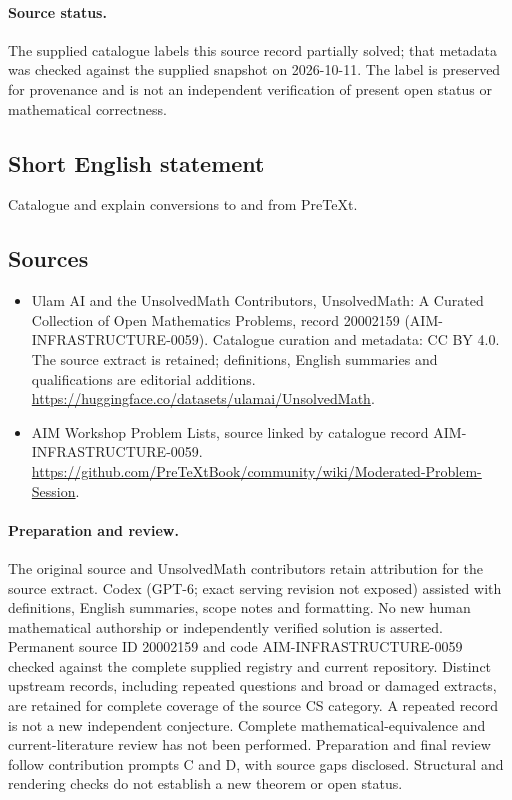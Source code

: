 \documentclass[11pt]{article}
\begin{document}
\paragraph{Source status.}
The supplied catalogue labels this source record partially solved; that metadata was checked against the supplied snapshot on 2026-10-11. The label is preserved for provenance and is not an independent verification of present open status or mathematical correctness.
\subsection{Short English statement}
Catalogue and explain conversions to and from PreTeXt.
\subsection{Sources}
\begin{itemize}
\item[\hypertarget{source:20002159:1}{S1}] Ulam AI and the UnsolvedMath Contributors, UnsolvedMath: A Curated Collection of Open Mathematics Problems, record 20002159 (AIM-INFRASTRUCTURE-0059). Catalogue curation and metadata: CC BY 4.0. The source extract is retained; definitions, English summaries and qualifications are editorial additions.
\url{https://huggingface.co/datasets/ulamai/UnsolvedMath}.
\item[\hypertarget{source:20002159:2}{S2}] AIM Workshop Problem Lists, source linked by catalogue record AIM-INFRASTRUCTURE-0059.
\url{https://github.com/PreTeXtBook/community/wiki/Moderated-Problem-Session}.
\end{itemize}
\paragraph{Preparation and review.}
The original source and UnsolvedMath contributors retain attribution for the source extract. Codex (GPT-6; exact serving revision not exposed) assisted with definitions, English summaries, scope notes and formatting. No new human mathematical authorship or independently verified solution is asserted. Permanent source ID 20002159 and code AIM-INFRASTRUCTURE-0059 checked against the complete supplied registry and current repository. Distinct upstream records, including repeated questions and broad or damaged extracts, are retained for complete coverage of the source CS category. A repeated record is not a new independent conjecture. Complete mathematical-equivalence and current-literature review has not been performed. Preparation and final review follow contribution prompts C and D, with source gaps disclosed. Structural and rendering checks do not establish a new theorem or open status.
\label{end:20002159}
\end{document}

